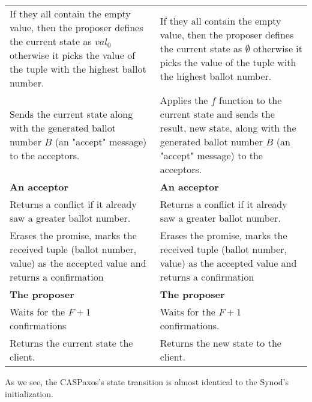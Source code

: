 \documentclass[12pt]{article}
\theoremstyle{definition}
\begin{document}
\begin{center}
\begin{longtable}{p{15em}|p{15em}}
  
  If they all contain the empty value, then the proposer defines the current state as $val_0$ otherwise it picks the value of the tuple with the highest ballot number.
  &
  If they all contain the empty value, then the proposer defines the current state as $\emptyset$ otherwise it picks the value of the tuple with the highest ballot number.
  \\[6pt]
  
  
  Sends the current state along with the generated ballot number $B$ (an "accept" message) to the acceptors.
  &
  Applies the $f$ function to the current state and sends the result, new state, along with the generated ballot number $B$ (an "accept" message) to the acceptors.
  \\[6pt]
  
  \hline
  
  {\bf An acceptor}
  &
  {\bf An acceptor} \\[6pt]
  
  
  Returns a conflict if it already saw a greater ballot number.
  &
  Returns a conflict if it already saw a greater ballot number.
  \\[6pt]
  
  
  Erases the promise, marks the received tuple (ballot number, value) as the accepted value and returns a confirmation
  &
  Erases the promise, marks the received tuple (ballot number, value) as the accepted value and returns a confirmation
  \\[6pt]
  
  \hline

  {\bf The proposer}
  &
  {\bf The proposer} \\[6pt]

  
  Waits for the $F+1$ confirmations
  &
  Waits for the $F+1$ confirmations. \\[6pt]
  
  
  Returns the current state the client.
  &
  Returns the new state to the client. \\[6pt]
  
  \hline
\end{longtable}
\end{center}

As we see, the CASPaxos's state transition is almost identical to the Synod's initialization. 
\end{document}
